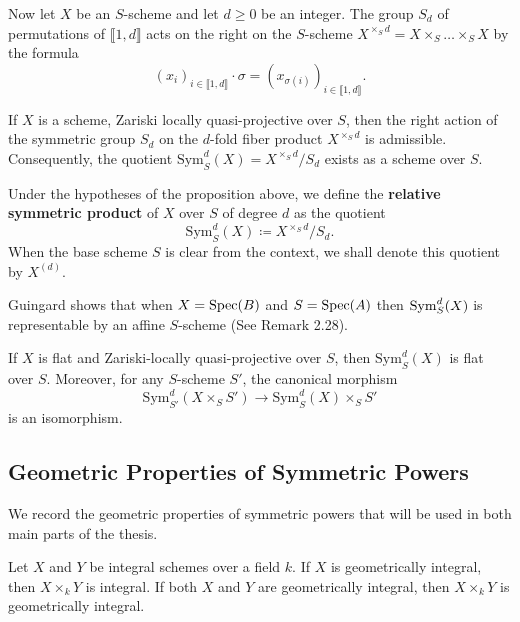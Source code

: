 Now let $X$ be an $S$-scheme and let $d \geq 0$ be an integer. The group ${S}_d$ of permutations of $\llbracket 1, d \rrbracket$ acts on the right on the $S$-scheme $X^{\times_S d} = X \times_S \dots \times_S X$ by the formula
\[
(x_i)_{i \in \llbracket 1, d \rrbracket} \cdot \sigma = (x_{\sigma(i)})_{i \in \llbracket 1, d \rrbracket}.
\]

\begin{prop}
    If $X$ is a scheme, Zariski locally quasi-projective over $S$, then the right action of the symmetric group $S_d$ on the $d$-fold fiber product 
    $X^{\times_S d}$ is admissible. 
    Consequently, the quotient $\mathrm{Sym}_S^d(X) = X^{\times_S d}/S_d$ exists as a scheme over $S$.
\end{prop}

\begin{definition}
    Under the hypotheses of the proposition above, we define the \textbf{relative symmetric product} of $X$ over $S$ 
    of degree $d$ as the quotient
    $$\mathrm{Sym}_S^d(X) \coloneqq X^{\times_S d}/S_d.$$
    When the base scheme $S$ is clear from the context, we shall denote this quotient by 
    $X^{(d)}$.
\end{definition}

Guingard shows that when $X=\operatorname{Spec}(B)$ and $S=\operatorname{Spec}(A)$ then $\operatorname{Sym}_{S}^d(X)$ is representable by an affine $S$-scheme (See \cite{Guignard2018} Remark 2.28).

\begin{prop}\label{prop:symmetric_power_flat_base_change}
If $X$ is flat and Zariski-locally quasi-projective over $S$, then $\text{Sym}_S^d(X)$ is flat over $S$. Moreover, for any $S$-scheme $S'$, the canonical morphism
\[
\text{Sym}_{S'}^d(X \times_S S') \to \text{Sym}_S^d(X) \times_S S'
\]
is an isomorphism.
\end{prop}

\subsection*{Geometric Properties of Symmetric Powers}

We record the geometric properties of symmetric powers that will be used in
both main parts of the thesis.

\begin{theorem}\label{theorem:int_geoint_implies_productint}
Let $X$ and $Y$ be integral schemes over a field $k$. If $X$ is geometrically
integral, then $X \times_k Y$ is integral. If both $X$ and $Y$ are
geometrically integral, then $X \times_k Y$ is geometrically integral.
\end{theorem}

